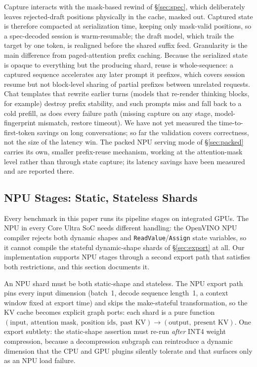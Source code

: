 \documentclass[11pt]{article}
\begin{document}
Capture interacts with the mask-based rewind of \S\ref{sec:spec}, which deliberately leaves rejected-draft positions physically in the cache, masked out. Captured state is therefore compacted at serialization time, keeping only mask-valid positions, so a spec-decoded session is warm-resumable; the draft model, which trails the target by one token, is realigned before the shared suffix feed. Granularity is the main difference from paged-attention prefix caching. Because the serialized state is opaque to everything but the producing shard, reuse is whole-sequence: a captured sequence accelerates any later prompt it prefixes, which covers session resume but not block-level sharing of partial prefixes between unrelated requests. Chat templates that rewrite earlier turns (models that re-render thinking blocks, for example) destroy prefix stability, and such prompts miss and fall back to a cold prefill, as does every failure path (missing capture on any stage, model-fingerprint mismatch, restore timeout). We have not yet measured the time-to-first-token savings on long conversations; so far the validation covers correctness, not the size of the latency win. The packed NPU serving mode of \S\ref{sec:packed} carries its own, smaller prefix-reuse mechanism, working at the attention-mask level rather than through state capture; its latency savings have been measured and are reported there.

\subsection{NPU Stages: Static, Stateless Shards}
\label{sec:npu}

Every benchmark in this paper runs its pipeline stages on integrated GPUs. The NPU in every Core Ultra SoC needs different handling: the OpenVINO NPU compiler rejects both dynamic shapes and \texttt{ReadValue}/\texttt{Assign} state variables, so it cannot compile the stateful dynamic-shape shards of \S\ref{sec:export} at all. Our implementation supports NPU stages through a second export path that satisfies both restrictions, and this section documents it.

An NPU shard must be both static-shape and stateless. The NPU export path pins every input dimension (batch~1, decode sequence length~1, a context window fixed at export time) and skips the make-stateful transformation, so the KV cache becomes explicit graph ports: each shard is a pure function $(\text{input},\ \text{attention mask},\ \text{position ids},\ \text{past KV}) \rightarrow (\text{output},\ \text{present KV})$. One export subtlety: the static-shape assertion must re-run \emph{after} INT4 weight compression, because a decompression subgraph can reintroduce a dynamic dimension that the CPU and GPU plugins silently tolerate and that surfaces only as an NPU load failure.
\end{document}
